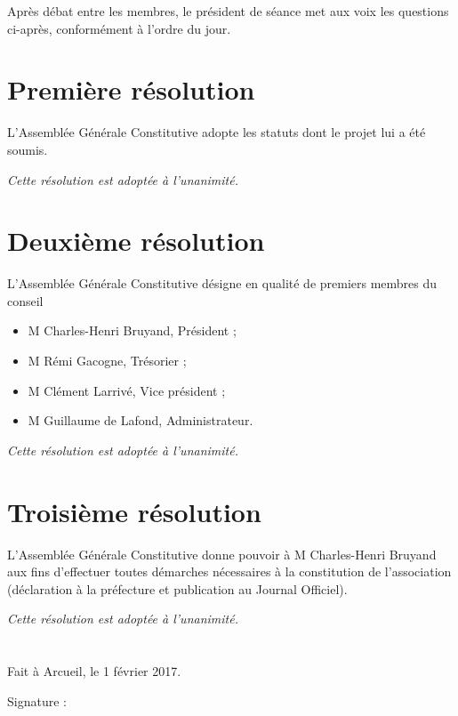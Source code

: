 \documentclass[a4paper,oneside,12pt]{article}
\begin{document}
Après débat entre les membres, le président de séance met aux voix les questions ci-après, conformément à l'ordre du jour.

\bigskip

\section*{Première résolution}

L’Assemblée Générale Constitutive adopte les statuts dont le projet lui a été soumis.

\medbreak

\begin{flushright}
  \textit{Cette résolution est adoptée à l’unanimité.}
\end{flushright}

\section*{Deuxième résolution}

L’Assemblée Générale Constitutive désigne en qualité de premiers membres du conseil

\bigskip

\begin{itemize}
\item M Charles-Henri Bruyand, Président ;
\item M Rémi Gacogne, Trésorier ;
\item M Clément Larrivé, Vice président ;
\item M Guillaume de Lafond, Administrateur.
\end{itemize}

\medbreak

\begin{flushright}
  \textit{Cette résolution est adoptée à l’unanimité.}
\end{flushright}

\section*{Troisième résolution}

L'Assemblée Générale Constitutive donne pouvoir à M Charles-Henri Bruyand aux fins d'effectuer toutes démarches nécessaires à la constitution de l'association (déclaration à la préfecture et publication au Journal Officiel).

\medbreak

\begin{flushright}
  \textit{Cette résolution est adoptée à l’unanimité.}
\end{flushright}

\section*{}

Fait à Arcueil, le 1 février 2017.

\bigskip

Signature :
\end{document}
